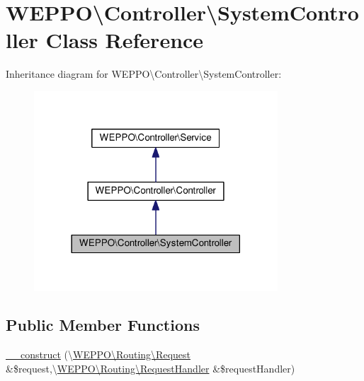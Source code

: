 \hypertarget{classWEPPO_1_1Controller_1_1SystemController}{}\section{W\+E\+P\+PO\textbackslash{}Controller\textbackslash{}System\+Controller Class Reference}
\label{classWEPPO_1_1Controller_1_1SystemController}


Inheritance diagram for W\+E\+P\+PO\textbackslash{}Controller\textbackslash{}System\+Controller\+:\nopagebreak
\begin{figure}[H]
\begin{center}
\leavevmode
\includegraphics[width=258pt]{classWEPPO_1_1Controller_1_1SystemController__inherit__graph}
\end{center}
\end{figure}
\subsection*{Public Member Functions}
\begin{DoxyCompactItemize}
\item 
\hyperlink{classWEPPO_1_1Controller_1_1SystemController_add8804a28bb82aaa9e08cbd6aa021d22}{\+\_\+\+\_\+construct} (\textbackslash{}\hyperlink{classWEPPO_1_1Routing_1_1Request}{W\+E\+P\+P\+O\textbackslash{}\+Routing\textbackslash{}\+Request} \&\$request,\textbackslash{}\hyperlink{classWEPPO_1_1Routing_1_1RequestHandler}{W\+E\+P\+P\+O\textbackslash{}\+Routing\textbackslash{}\+Request\+Handler} \&\$request\+Handler)
\end{DoxyCompactItemize}

